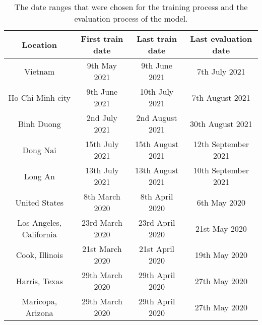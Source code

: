 \begin{table}[h]
    \centering
    \begin{tabular}{| c | c | c | c |}
        Location & First train date & Last train date & Last evaluation date \\
        \hline\hline
        Vietnam & 9th May 2021 & 9th June 2021 & 7th July 2021 \\
        \hline
        Ho Chi Minh city & 9th June 2021 & 10th July 2021 & 7th August 2021 \\
        \hline
        Binh Duong & 2nd July 2021 & 2nd August 2021 & 30th August 2021 \\
        \hline
        Dong Nai & 15th July 2021 & 15th August 2021 & 12th September 2021 \\
        \hline
        Long An & 13th July 2021 & 13th August 2021 & 10th September 2021 \\
        \hline
        United States & 8th March 2020 & 8th April 2020 & 6th May 2020 \\
        \hline
        Los Angeles, California & 23rd March 2020 & 23rd April 2020 & 21st May 2020 \\
        \hline
        Cook, Illinois & 21st March 2020 & 21st April 2020 & 19th May 2020 \\
        \hline
        Harris, Texas & 29th March 2020 & 29th April 2020 & 27th May 2020 \\
        \hline
        Maricopa, Arizona & 29th March 2020 & 29th April 2020 & 27th May 2020 \\
        \hline
    \end{tabular}
    \caption{The date ranges that were chosen for the training process and the evaluation process of the model.}
    \label{tab:chosen-dataset-dates}
\end{table}

